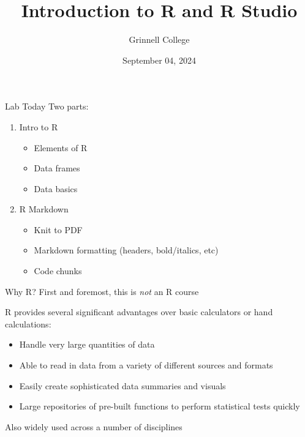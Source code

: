 \documentclass{beamer}
\title[STA-209]{Introduction to R and R Studio}
\subtitle{}
\author{Grinnell College}
\date{September 04, 2024}
\begin{document}
\begin{frame}
  \titlepage
\end{frame}

\begin{frame}{Lab Today}
Two parts:

\begin{enumerate}
\item Intro to R
	\begin{itemize}
	\item Elements of R
	\item Data frames
	\item Data basics
	\end{itemize}
\item R Markdown
	\begin{itemize}
	\item Knit to PDF
	\item Markdown formatting (headers, bold/italics, etc)
	\item Code chunks
	\end{itemize}
\end{enumerate}
\end{frame}

\begin{frame}{Why R?}
First and foremost, this is \textit{not} an R course \vspace{4mm}

R provides several significant advantages over basic calculators or hand calculations:
\begin{itemize}
\item Handle very large quantities of data
\item Able to read in data from a variety of different sources and formats
\item Easily create sophisticated data summaries and visuals
\item Large repositories of pre-built functions to perform statistical tests quickly
\end{itemize}

\vspace{4mm}

Also widely used across a number of disciplines

\end{frame}
\end{document}
